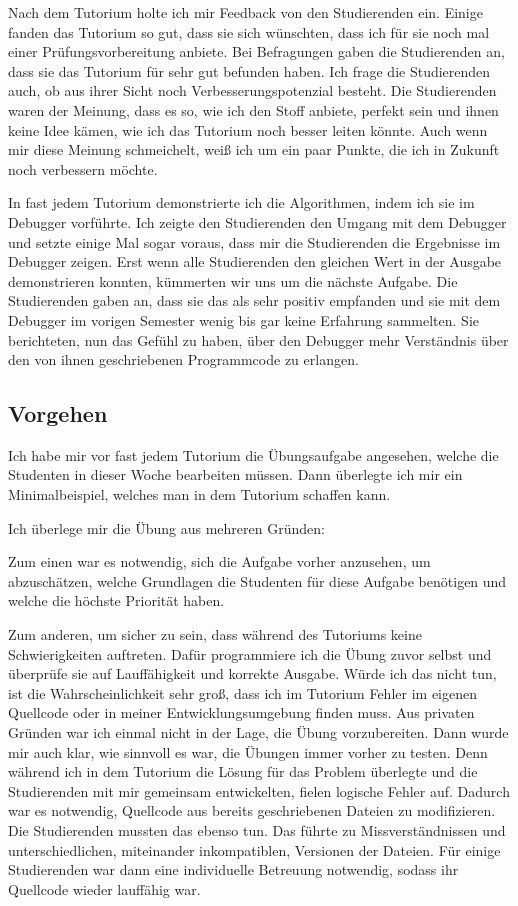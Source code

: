 Nach dem Tutorium holte ich mir Feedback von den Studierenden ein. Einige fanden das Tutorium so gut, dass sie sich wünschten, dass ich für sie noch mal einer Prüfungsvorbereitung anbiete. Bei Befragungen gaben die Studierenden an, dass sie das Tutorium für sehr gut befunden haben. Ich frage die Studierenden auch, ob aus ihrer Sicht noch Verbesserungspotenzial besteht. Die Studierenden waren der Meinung, dass es so, wie ich den Stoff anbiete, perfekt sein und ihnen keine Idee kämen, wie ich das Tutorium noch besser leiten könnte. Auch wenn mir diese Meinung schmeichelt, weiß ich um ein paar Punkte, die ich in Zukunft noch verbessern möchte.

In fast jedem Tutorium demonstrierte ich die Algorithmen, indem ich sie im Debugger vorführte. Ich zeigte den Studierenden den Umgang mit dem Debugger und setzte einige Mal sogar voraus, dass mir die Studierenden die Ergebnisse im Debugger zeigen. Erst wenn alle Studierenden den gleichen Wert in der Ausgabe demonstrieren konnten, kümmerten wir uns um die nächste Aufgabe. Die Studierenden gaben an, dass sie das als sehr positiv empfanden und sie mit dem Debugger im vorigen Semester wenig bis gar keine Erfahrung sammelten. Sie berichteten, nun das Gefühl zu haben, über den Debugger mehr Verständnis über den von ihnen geschriebenen Programmcode zu erlangen.

\subsection{Vorgehen}


Ich habe mir vor fast jedem Tutorium die Übungsaufgabe angesehen, welche die Studenten in dieser Woche bearbeiten müssen. Dann überlegte ich mir ein Minimalbeispiel, welches man in dem Tutorium schaffen kann.

Ich überlege mir die Übung aus mehreren Gründen:

Zum einen war es notwendig, sich die Aufgabe vorher anzusehen, um abzuschätzen, welche Grundlagen die Studenten für diese Aufgabe benötigen und welche die höchste Priorität haben.

Zum anderen, um sicher zu sein, dass während des Tutoriums keine Schwierigkeiten auftreten. Dafür programmiere ich die Übung zuvor selbst und überprüfe sie auf Lauffähigkeit und korrekte Ausgabe. Würde ich das nicht tun, ist die Wahrscheinlichkeit sehr groß, dass ich im Tutorium Fehler im eigenen Quellcode oder in meiner Entwicklungsumgebung finden muss. Aus privaten Gründen war ich einmal nicht in der Lage, die Übung vorzubereiten. Dann wurde mir auch klar, wie sinnvoll es war, die Übungen immer vorher zu testen. Denn während ich in dem Tutorium die Lösung für das Problem überlegte und die Studierenden mit mir gemeinsam entwickelten, fielen logische Fehler auf. Dadurch war es notwendig, Quellcode aus bereits geschriebenen Dateien zu modifizieren. Die Studierenden mussten das ebenso tun. Das führte zu Missverständnissen und unterschiedlichen, miteinander inkompatiblen, Versionen der Dateien. Für einige Studierenden war dann eine individuelle Betreuung notwendig, sodass ihr Quellcode wieder lauffähig war.

